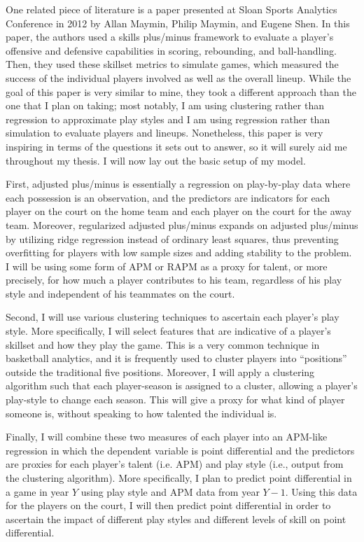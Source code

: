 \documentclass[12pt]{article}
\begin{document}
One related piece of literature is a paper presented at Sloan Sports Analytics
Conference in 2012 by Allan Maymin, Philip Maymin, and Eugene
Shen\cite{maymin_2012}. In this paper, the authors used a skills plus/minus
framework to evaluate a player's offensive and defensive capabilities in
scoring, rebounding, and ball-handling. Then, they used these skillset metrics
to simulate games, which measured the success of the individual players
involved as well as the overall lineup. While the goal of this paper is very
similar to mine, they took a different approach than the one that I plan on
taking; most notably, I am using clustering rather than regression to
approximate play styles and I am using regression rather than simulation to
evaluate players and lineups. Nonetheless, this paper is very inspiring in
terms of the questions it sets out to answer, so it will surely aid me
throughout my thesis. I will now lay out the basic setup of my model.

First, adjusted plus/minus is essentially a regression on play-by-play data
where each possession is an observation, and the predictors are indicators for
each player on the court on the home team and each player on the court for the
away team. Moreover, regularized adjusted plus/minus expands on adjusted
plus/minus by utilizing ridge regression instead of ordinary least squares,
thus preventing overfitting for players with low sample sizes and adding
stability to the problem. I will be using some form of APM or RAPM as a proxy
for talent, or more precisely, for how much a player contributes to his team,
regardless of his play style and independent of his teammates on the court.

Second, I will use various clustering techniques to ascertain each player's
play style. More specifically, I will select features that are indicative of a
player's skillset and how they play the game. This is a very common technique
in basketball analytics, and it is frequently used to cluster players into
``positions'' outside the traditional five positions\cite{lutz_2012}. Moreover,
I will apply a clustering algorithm such that each player-season is assigned to
a cluster, allowing a player's play-style to change each season. This will give
a proxy for what kind of player someone is, without speaking to how talented
the individual is.

Finally, I will combine these two measures of each player into an APM-like
regression in which the dependent variable is point differential and the
predictors are proxies for each player's talent (i.e. APM) and play style
(i.e., output from the clustering algorithm). More specifically, I plan to
predict point differential in a game in year $Y$ using play style and APM data
from year $Y-1$. Using this data for the players on the court, I will then
predict point differential in order to ascertain the impact of different play
styles and different levels of skill on point differential.
\end{document}
